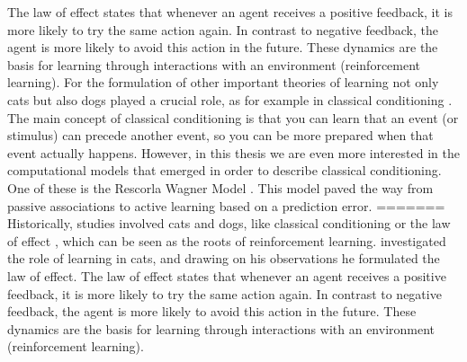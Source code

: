 The law of effect states that whenever an agent receives a positive feedback, it is more likely to try the same action again. In contrast to negative feedback, the agent is more likely to avoid this action in the future.
These dynamics are the basis for learning through interactions with an environment (reinforcement learning).%
For the formulation of other important theories of learning not only cats but also dogs played a crucial role, as for example in classical conditioning \citep{pavlov1927conditional}. 
The main concept of classical conditioning is that you can learn that an event (or stimulus) can precede another event, so you can be more prepared when that event actually happens. However, in this thesis we are even more interested in the computational models that emerged in order to describe classical conditioning. One of these is the Rescorla Wagner Model \citep{rescorla1972theory}. This model paved the way from passive associations to active learning based on a prediction error.
=======
Historically, studies involved cats and dogs, like classical conditioning \citep{pavlov1927conditional} or the law of effect \citep{thorndike1927law}, which can be seen as the roots of reinforcement learning. 
\citet{thorndike1927law} investigated the role of learning in cats, and drawing on his observations he formulated the law of effect.
The law of effect states that whenever an agent receives a positive feedback, it is more likely to try the same action again. In contrast to negative feedback, the agent is more likely to avoid this action in the future.
These dynamics are the basis for learning through interactions with an environment (reinforcement learning).%
